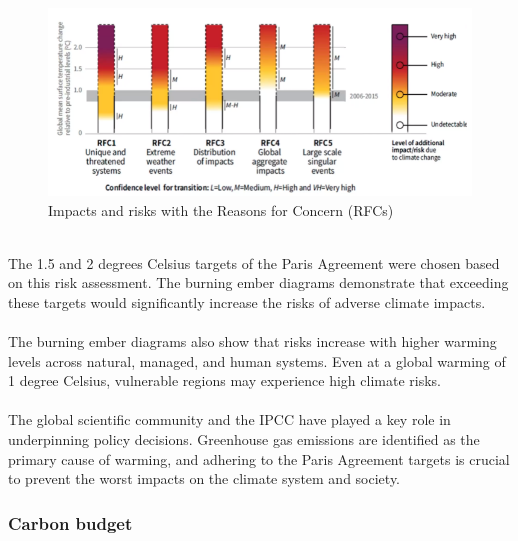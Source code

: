 \documentclass[../summary.tex]{subfiles}
\begin{document}
\begin{figure}[H]
	\centering
	\includegraphics[width=0.6\linewidth]{images/impacts_and_risks}
	\caption{Impacts and risks with the Reasons for Concern (RFCs)}
	\label{fig:impactsandrisks}
\end{figure}
\ \\
The 1.5 and 2 degrees Celsius targets of the Paris Agreement were chosen based on this risk assessment. The burning ember diagrams demonstrate that exceeding these targets would significantly increase the risks of adverse climate impacts.\\
\\
The burning ember diagrams also show that risks increase with higher warming levels across natural, managed, and human systems. Even at a global warming of 1 degree Celsius, vulnerable regions may experience high climate risks.\\
\\
The global scientific community and the IPCC have played a key role in underpinning policy decisions. Greenhouse gas emissions are identified as the primary cause of warming, and adhering to the Paris Agreement targets is crucial to prevent the worst impacts on the climate system and society.

\subsubsection{Carbon budget}
\end{document}
